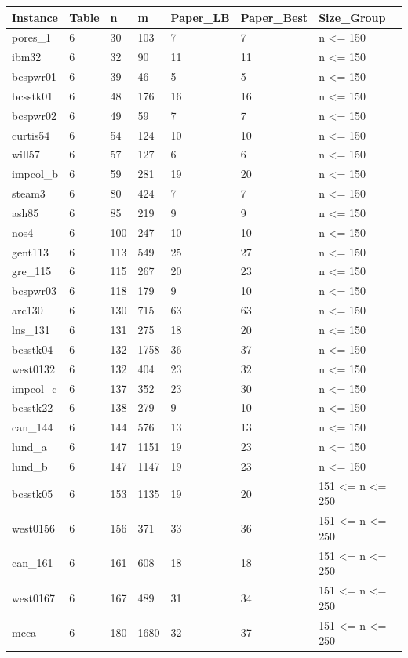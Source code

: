 \begin{tabular}{lllllll}
\hline
Instance & Table & n & m & Paper\_LB & Paper\_Best & Size\_Group \\
\hline
pores\_1 & 6 & 30 & 103 & 7 & 7 & n <= 150 \\
ibm32 & 6 & 32 & 90 & 11 & 11 & n <= 150 \\
bcspwr01 & 6 & 39 & 46 & 5 & 5 & n <= 150 \\
bcsstk01 & 6 & 48 & 176 & 16 & 16 & n <= 150 \\
bcspwr02 & 6 & 49 & 59 & 7 & 7 & n <= 150 \\
curtis54 & 6 & 54 & 124 & 10 & 10 & n <= 150 \\
will57 & 6 & 57 & 127 & 6 & 6 & n <= 150 \\
impcol\_b & 6 & 59 & 281 & 19 & 20 & n <= 150 \\
steam3 & 6 & 80 & 424 & 7 & 7 & n <= 150 \\
ash85 & 6 & 85 & 219 & 9 & 9 & n <= 150 \\
nos4 & 6 & 100 & 247 & 10 & 10 & n <= 150 \\
gent113 & 6 & 113 & 549 & 25 & 27 & n <= 150 \\
gre\_115 & 6 & 115 & 267 & 20 & 23 & n <= 150 \\
bcspwr03 & 6 & 118 & 179 & 9 & 10 & n <= 150 \\
arc130 & 6 & 130 & 715 & 63 & 63 & n <= 150 \\
lns\_131 & 6 & 131 & 275 & 18 & 20 & n <= 150 \\
bcsstk04 & 6 & 132 & 1758 & 36 & 37 & n <= 150 \\
west0132 & 6 & 132 & 404 & 23 & 32 & n <= 150 \\
impcol\_c & 6 & 137 & 352 & 23 & 30 & n <= 150 \\
bcsstk22 & 6 & 138 & 279 & 9 & 10 & n <= 150 \\
can\_144 & 6 & 144 & 576 & 13 & 13 & n <= 150 \\
lund\_a & 6 & 147 & 1151 & 19 & 23 & n <= 150 \\
lund\_b & 6 & 147 & 1147 & 19 & 23 & n <= 150 \\
bcsstk05 & 6 & 153 & 1135 & 19 & 20 & 151 <= n <= 250 \\
west0156 & 6 & 156 & 371 & 33 & 36 & 151 <= n <= 250 \\
can\_161 & 6 & 161 & 608 & 18 & 18 & 151 <= n <= 250 \\
west0167 & 6 & 167 & 489 & 31 & 34 & 151 <= n <= 250 \\
mcca & 6 & 180 & 1680 & 32 & 37 & 151 <= n <= 250 \\

\end{tabular}

